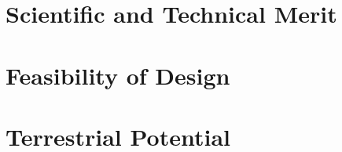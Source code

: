 \documentclass{../tex/report}
\begin{document}


\section{Scientific and Technical Merit}

\section{Feasibility of Design}


\section{Terrestrial Potential}
\end{document}
